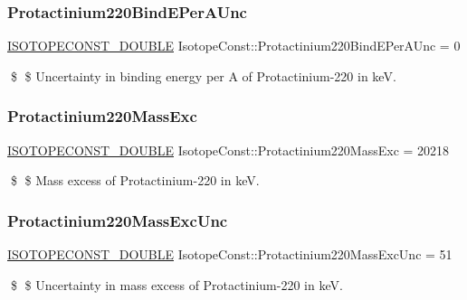 \subsubsection{\texorpdfstring{Protactinium220\+Bind\+E\+Per\+A\+Unc}{Protactinium220BindEPerAUnc}}
{\footnotesize\ttfamily \mbox{\hyperlink{group___isotope_const-_macros_ga8f45a7272ce02c0b4c65c44636ed719a}{I\+S\+O\+T\+O\+P\+E\+C\+O\+N\+S\+T\+\_\+\+D\+O\+U\+B\+LE}} Isotope\+Const\+::\+Protactinium220\+Bind\+E\+Per\+A\+Unc = 0}

\$ \$ Uncertainty in binding energy per A of Protactinium-\/220 in keV. \mbox{\label{group___isotope_const-_protactinium-_pa220_ga78c223410145bb83452191a119e3c8e6}} 
\subsubsection{\texorpdfstring{Protactinium220\+Mass\+Exc}{Protactinium220MassExc}}
{\footnotesize\ttfamily \mbox{\hyperlink{group___isotope_const-_macros_ga8f45a7272ce02c0b4c65c44636ed719a}{I\+S\+O\+T\+O\+P\+E\+C\+O\+N\+S\+T\+\_\+\+D\+O\+U\+B\+LE}} Isotope\+Const\+::\+Protactinium220\+Mass\+Exc = 20218}

\$ \$ Mass excess of Protactinium-\/220 in keV. \mbox{\label{group___isotope_const-_protactinium-_pa220_gab87e4040067429c7102415791b44a8c7}} 
\subsubsection{\texorpdfstring{Protactinium220\+Mass\+Exc\+Unc}{Protactinium220MassExcUnc}}
{\footnotesize\ttfamily \mbox{\hyperlink{group___isotope_const-_macros_ga8f45a7272ce02c0b4c65c44636ed719a}{I\+S\+O\+T\+O\+P\+E\+C\+O\+N\+S\+T\+\_\+\+D\+O\+U\+B\+LE}} Isotope\+Const\+::\+Protactinium220\+Mass\+Exc\+Unc = 51}

\$ \$ Uncertainty in mass excess of Protactinium-\/220 in keV. \mbox{\label{group___isotope_const-_protactinium-_pa220_ga913088f737c8c0113b7198ea8bbe7849}} 
